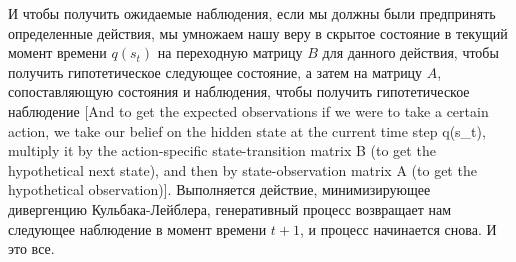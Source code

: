 \documentclass[twoside,leqno, 11pt]{article}
\begin{document}
	
	И чтобы получить ожидаемые наблюдения, если мы должны были предпринять определенные действия, мы умножаем нашу веру в скрытое состояние в текущий момент времени $q(s_t)$ на переходную матрицу $B$ для данного действия, чтобы получить гипотетическое следующее состояние, а затем на матрицу $A$, сопоставляющую состояния и наблюдения, чтобы получить гипотетическое наблюдение [And to get the expected observations if we were to take a certain action, we take our belief on the hidden state at the current time step q(s\_t), multiply it by the action-specific state-transition matrix B (to get the hypothetical next state), and then by state-observation matrix A (to get the hypothetical observation)]. Выполняется действие, минимизирующее дивергенцию Кульбака-Лейблера, генеративный процесс возвращает нам следующее наблюдение в момент времени $t+1$, и процесс начинается снова. И это все.
	
	\newpage
	
	\begin{figure}[h]
	\end{figure}
	
	
\end{document}

